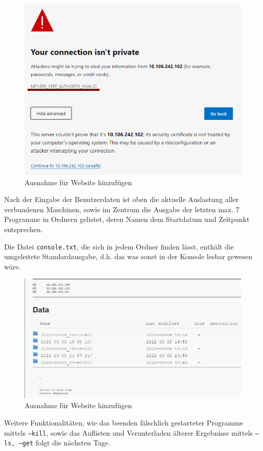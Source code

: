 \documentclass[11pt, a4paper]{article}
\begin{document}
\begin{figure}[h]
    \centering
    \includegraphics[width=0.7\linewidth]{./pics/2022-03-09_01-03_1.png}
    \caption{Ausnahme für Website hinzufügen}
    \label{fig:web-1}
\end{figure}

Nach der Eingabe der Benutzerdaten ist oben die aktuelle Auslastung aller verbundenen Maschinen, sowie im Zentrum die Ausgabe der letzten max. 7 Programme in Ordnern gelistet, deren Namen dem Startdatum und Zeitpunkt entsprechen.

Die Datei \texttt{console.txt}, die sich in jedem Ordner finden lässt, enthält die umgeleitete Standardausgabe, d.h. das was sonst in der Konsole lesbar gewesen wäre.

\begin{figure}[h]
    \centering
    \includegraphics[width=0.7\linewidth]{./pics/2022-03-09_01-18.png}
    \caption{Ausnahme für Website hinzufügen}
    \label{fig:web-1}
\end{figure}

Weitere Funktionalitäten, wie das beenden fälschlich gestarteter Programme mittels \texttt{--kill}, sowie das Auflisten und Verunterladen älterer Ergebnisse mittels \texttt{--ls, --get} folgt die nächsten Tage.
\end{document}
